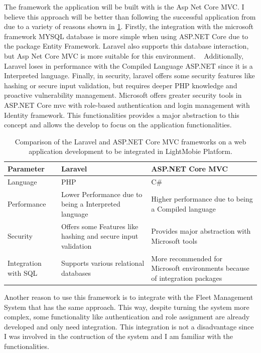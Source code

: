 The framework the application will be built with is the Asp Net Core MVC. 
I believe this approach will be better than following the successful application from \citet{MAS_MOTORS} due to a variety of reasons shown in \ref{table:architetcture_comparison}.
Firstly, the integration with the microsoft framework MYSQL database is more simple when using ASP.NET Core due to the package Entity Framework. %
Laravel also supports this database interaction, but Asp Net Core MVC is more suitable for this environment. ~\cite{asp_net_vs_laravel}
Additionally, Laravel loses in performance with the Compiled Language ASP.NET since it is a Interpreted language. 
Finally, in security, laravel offers some security features like hashing or secure input validation, but requires deeper PHP knowledge and proactive vulnerability management. 
Microsoft offers greater security tools in ASP.NET Core mvc with role-based authentication and login management with Identity framework.
This functionalities provides a major abstraction to this concept and allows the develop to focus on the application functionalities. ~\cite{asp_net_vs_laravel}


\begin{table}[]
  \begin{tabular}{| m{5em} | m{15em} | m{15em} |}
    \hline
   Parameter & Laravel  & ASP.NET Core MVC   \\
   \hline
   Language & PHP &  C\#  \\
   \hline
   Performance &  Lower Performance due to being a Interpreted language & Higher performance due to being a Compiled language   \\
   \hline
   Security & Offers some Features like hashing and secure input validation &  Provides major abstraction with Microsoft tools   \\
   \hline
   Integration with SQL & Supports various relational databases & More recommended for Microsoft environments because of integration packages  \\
   \hline
  \end{tabular}
  \caption{Comparison of the Laravel and ASP.NET Core MVC frameworks on a web application development to be integrated in LightMobie Platform.}
  \label{table:architetcture_comparison}
  \end{table}

Another reason to use this framework is to integrate with the Fleet Management System that has the same approach. 
This way, despite turning the system more complex, some functionality like authentication and role assignment are already developed and only need integration. 
This integration is not a disadvantage since I was involved in the contruction of the system and I am familiar with the functionalities.






